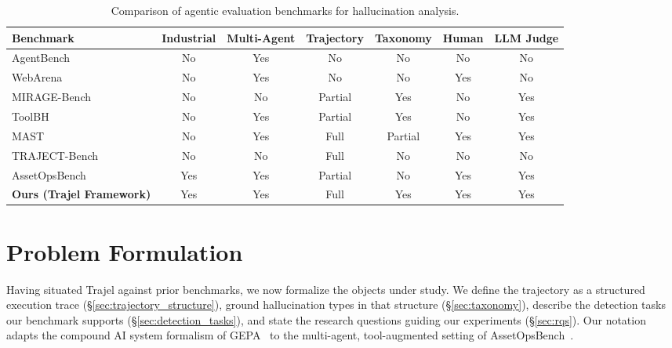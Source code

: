 \documentclass{article}
\begin{document}
\begin{table}[!ht]
\caption{Comparison of agentic evaluation benchmarks for hallucination analysis.}
\label{tab:comparison}
\centering
\footnotesize
\setlength{\tabcolsep}{4pt}
\begin{tabular}{lcccccc}
\toprule
\textbf{Benchmark} & \textbf{Industrial} & \textbf{Multi-Agent} & \textbf{Trajectory} & \textbf{Taxonomy} & \textbf{Human} & \textbf{LLM Judge} \\
\midrule
AgentBench~\cite{liu2023agentbench}         & No  & Yes & No      & No      & No  & No  \\
WebArena~\cite{deng2024webarena}             & No  & Yes & No      & No      & Yes & No  \\
MIRAGE-Bench~\cite{zhang2025miragebench}     & No  & No  & Partial & Yes     & No  & Yes \\
ToolBH~\cite{wu2024toolbh}                  & No  & Yes & Partial & Yes     & No  & Yes \\
MAST~\cite{cemri2025mast}                   & No  & Yes & Full    & Partial & Yes & Yes \\
TRAJECT-Bench~\cite{he2026trajectbench}      & No  & No  & Full    & No      & No  & No  \\
AssetOpsBench~\cite{assetopsbench}           & Yes & Yes & Partial & No      & Yes & Yes \\
\midrule
\textbf{Ours (Trajel Framework)}             & Yes & Yes & Full    & Yes     & Yes & Yes \\
\bottomrule
\end{tabular}
\end{table}

\section{Problem Formulation}
\label{sec:problem_formulation}
Having situated Trajel against prior benchmarks, we now formalize the objects under study. We define the trajectory as a structured execution trace (\S\ref{sec:trajectory_structure}), ground hallucination types in that structure (\S\ref{sec:taxonomy}), describe the detection tasks our benchmark supports (\S\ref{sec:detection_tasks}), and state the research questions guiding our experiments (\S\ref{sec:rqs}). Our notation adapts the compound AI system formalism of GEPA~\cite{gepa} to the multi-agent, tool-augmented setting of AssetOpsBench~\cite{assetopsbench}.
\end{document}
